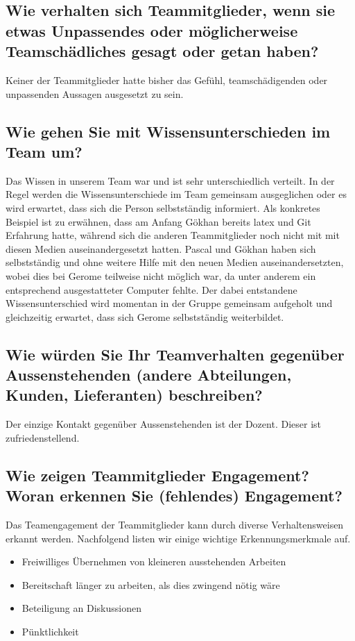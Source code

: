 \subsection*{Wie verhalten sich Teammitglieder, wenn sie etwas Unpassendes oder möglicherweise Teamschädliches gesagt oder getan haben?}

Keiner der Teammitglieder hatte bisher das Gefühl, teamschädigenden oder unpassenden Aussagen ausgesetzt zu sein.

\subsection*{Wie gehen Sie mit Wissensunterschieden im Team um?}

Das Wissen in unserem Team war und ist sehr unterschiedlich verteilt. 
In der Regel werden die Wissensunterschiede im Team gemeinsam ausgeglichen oder es wird erwartet, dass sich die Person selbstständig informiert. Als konkretes Beispiel ist zu erwähnen, dass am Anfang Gökhan bereits latex und Git Erfahrung hatte, während sich die anderen Teammitglieder noch nicht mit mit diesen Medien auseinandergesetzt hatten. Pascal und Gökhan haben sich selbstständig und ohne weitere Hilfe mit den neuen Medien auseinandersetzten, wobei dies bei Gerome teilweise nicht möglich war, da unter anderem ein entsprechend ausgestatteter Computer fehlte. Der dabei entstandene Wissensunterschied wird momentan in der Gruppe gemeinsam aufgeholt und gleichzeitig erwartet, dass sich Gerome selbstständig weiterbildet.  

\subsection*{Wie würden Sie Ihr Teamverhalten gegenüber Aussenstehenden (andere Abteilungen,
Kunden, Lieferanten) beschreiben?}

Der einzige Kontakt gegenüber Aussenstehenden ist der Dozent. Dieser ist zufriedenstellend. 

\subsection*{Wie zeigen Teammitglieder Engagement? Woran erkennen Sie (fehlendes)
Engagement?}

Das Teamengagement der Teammitglieder kann durch diverse Verhaltensweisen erkannt werden. Nachfolgend listen wir einige wichtige Erkennungsmerkmale auf.

\begin{itemize}

\item Freiwilliges Übernehmen von kleineren ausstehenden Arbeiten

\item Bereitschaft länger zu arbeiten, als dies zwingend nötig wäre

\item Beteiligung an Diskussionen

\item Pünktlichkeit

\end{itemize}

